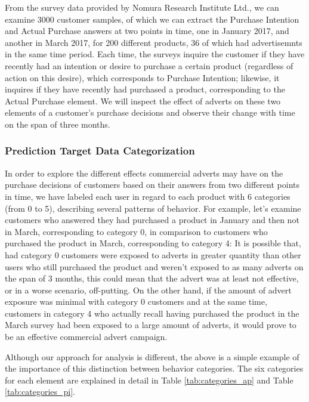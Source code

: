 \documentclass[review]{elsarticle}
\begin{document}
From the survey data provided by Nomura Research Institute Ltd., we can examine 3000 customer samples, of which we can extract the Purchase Intention and Actual Purchase answers at two points in time, one in January 2017, and another in March 2017, for 200 different products, 36 of which had advertisemnts in the same time period. Each time, the surveys inquire the customer if they have recently had an intention or desire to purchase a certain product (regardless of action on this desire), which corresponds to Purchase Intention; likewise, it inquires if they have recently had purchased a product, corresponding to the Actual Purchase element. We will inspect the effect of adverts on these two elements of a customer's purchase decisions and observe their change with time on the span of three months.

\subsubsection{Prediction Target Data Categorization}
\label{target_data_cat}

In order to explore the different effects commercial adverts may have on the purchase decisions of customers based on their answers from two different points in time, we have labeled each user in regard to each product with 6 categories (from 0 to 5), describing several patterns of behavior. For example, let's examine customers who answered they had purchased a product in January and then not in March, corresponding to category 0, in comparison to customers who purchased the product in March, corresponding to category 4: It is possible that, had category 0 customers were exposed to adverts in greater quantity than other users who still purchased the product and weren't exposed to as many adverts on the span of 3 months, this could mean that the advert was at least not effective, or in a worse scenario, off-putting. On the other hand, if the amount of advert exposure was minimal with category 0 customers and at the same time, customers in category 4 who actually recall having purchased the product in the March survey had been exposed to a large amount of adverts, it would prove to be an effective commercial advert campaign.

Although our approach for analysis is different, the above is a simple example of the importance of this distinction between behavior categories. The six categories for each element are explained in detail in Table \ref{tab:categories_ap} and Table \ref{tab:categories_pi}.
\end{document}
